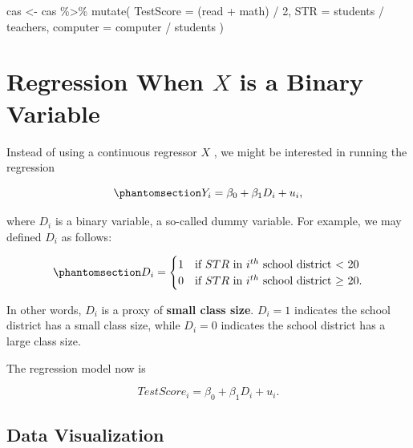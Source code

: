 \documentclass[
  12pt,
  a4paper,
]{scrbook}
\newenvironment{Shaded}{\begin{snugshade}}{\end{snugshade}}
\newcommand{\AttributeTok}[1]{\textcolor[rgb]{0.40,0.45,0.13}{#1}}
\newcommand{\DecValTok}[1]{\textcolor[rgb]{0.68,0.00,0.00}{#1}}
\newcommand{\FunctionTok}[1]{\textcolor[rgb]{0.28,0.35,0.67}{#1}}
\newcommand{\NormalTok}[1]{\textcolor[rgb]{0.00,0.23,0.31}{#1}}
\newcommand{\OtherTok}[1]{\textcolor[rgb]{0.00,0.23,0.31}{#1}}
\newcommand{\SpecialCharTok}[1]{\textcolor[rgb]{0.37,0.37,0.37}{#1}}
\theoremstyle{plain}
\theoremstyle{definition}
\theoremstyle{remark}
\begin{document}
\begin{Shaded}
\begin{Highlighting}[]
\NormalTok{cas }\OtherTok{\textless{}{-}}\NormalTok{ cas }\SpecialCharTok{\%\textgreater{}\%}
    \FunctionTok{mutate}\NormalTok{(}
        \AttributeTok{TestScore =}\NormalTok{ (read }\SpecialCharTok{+}\NormalTok{ math) }\SpecialCharTok{/} \DecValTok{2}\NormalTok{,}
        \AttributeTok{STR =}\NormalTok{ students }\SpecialCharTok{/}\NormalTok{ teachers,}
        \AttributeTok{computer =}\NormalTok{ computer }\SpecialCharTok{/}\NormalTok{ students}
\NormalTok{    )}
\end{Highlighting}
\end{Shaded}

\section{\texorpdfstring{Regression When \(X\) is a Binary
Variable}{Regression When X is a Binary Variable}}\label{regression-when-x-is-a-binary-variable}

Instead of using a continuous regressor \(X\) , we might be interested
in running the regression

\begin{equation}\protect\phantomsection\label{eq-binary-regression}{
Y_i = \beta_0 + \beta_1 D_i + u_i, 
}\end{equation}

where \(D_i\) is a binary variable, a so-called dummy variable. For
example, we may defined \(D_i\) as follows:

\begin{equation}\protect\phantomsection\label{eq-dummy-variable}{
D_i = 
\begin{cases}
    1 & \text{if $STR$ in $i^{th}$ school district < 20} \\
    0 & \text{if $STR$ in $i^{th}$ school district $\geq$ 20}.
\end{cases}
}\end{equation}

In other words, \(D_i\) is a proxy of {\textbf{small class size}}.
\(D_i = 1\) indicates the school district has a small class size, while
\(D_i = 0\) indicates the school district has a large class size.

The regression model now is

\[
TestScore_i = \beta_0 + \beta_1 D_i + u_i.
\]

\subsection{Data Visualization}\label{data-visualization-1}
\end{document}
